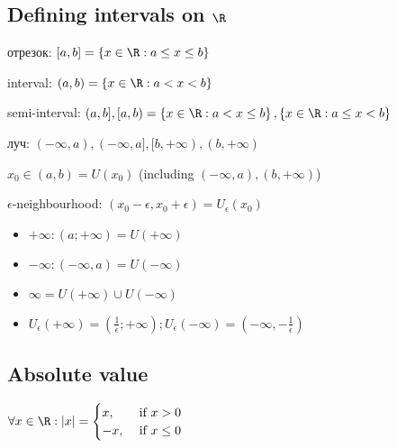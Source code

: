 \subsection{Defining intervals on $\R$}

\begin{definition}[]
	отрезок: $[a,b] = \left\{ x \in \R: a \leq x \leq b \right \} $	
	
	interval: $\left( a,b \right) = \left\{ x \in \R: a < x < b \right \} $
	
	semi-interval: $(a, b], [a, b) = \left\{ x \in \R: a < x \leq b \right \}, \left\{ x \in \R: a \leq x < b \right \}  $

	луч: $(-\infty, a), (-\infty, a], [b, +\infty), (b, +\infty)$
\end{definition}

\begin{definition}
	 $x_0 \in (a,b) = U(x_0)$ (including $(-\infty, a), (b, +\infty)$)

	 $\epsilon$-neighbourhood:  $(x_0-\epsilon, x_0+\epsilon) = U_\epsilon (x_0)$
\end{definition}

\begin{definition}
	\begin{itemize}
		\item  $+\infty: (a; +\infty) = U(+\infty)$
		\item $-\infty: (-\infty, a) = U(-\infty)$ 
		\item $\infty = U(+\infty) \cup U(-\infty)$ 
		\item $U_\epsilon(+\infty) = (\frac{1}{\epsilon}; +\infty); U_\epsilon(-\infty) = (-\infty, -\frac{1}{\epsilon})$ 
	\end{itemize}
\end{definition}

\subsection{Absolute value}

\begin{definition}[]
	$\forall x \in \R: |x| = \begin{cases}
		x, &\text{ if }x>0\\
		-x, &\text{ if }x \leq 0
	\end{cases}$
\end{definition}

